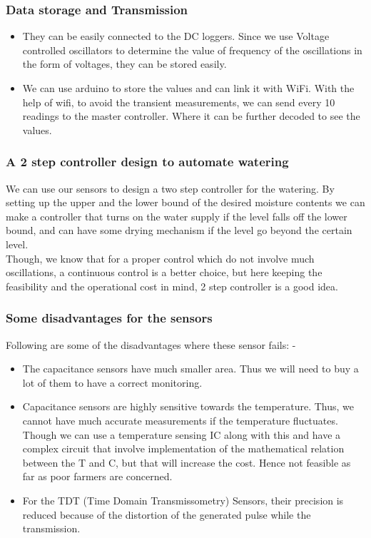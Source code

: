 \documentclass[11pt]{article}
\begin{document}
\subsubsection{Data storage and Transmission}
\begin{itemize}
    \item They can be easily connected to the DC loggers. Since we use Voltage controlled oscillators to determine the value of frequency of the oscillations in the form of voltages, they can be stored easily.
    \item We can use arduino to store the values and can link it with WiFi. With the help of wifi, to avoid the transient measurements, we can send every 10 readings to the master controller. Where it can be further decoded to see the values.
\end{itemize}
\subsubsection{A 2 step controller design to automate watering}
We can use our sensors to design a two step controller for the watering. By setting up the upper and the lower bound of the desired moisture contents we can make a controller that turns on the water supply if the level falls off the lower bound, and can have some drying mechanism if the level go beyond the certain level. \\
Though, we know that for a proper control which do not involve much oscillations, a continuous control is a better choice, but here keeping the feasibility and the operational cost in mind, 2 step controller is a good idea.
\\
\subsubsection{Some disadvantages for the sensors}
Following are some of the disadvantages where these sensor fails: - \\
\begin{itemize}
    \item The capacitance sensors have much smaller area. Thus we will need to buy a lot of them to have a correct monitoring. 
    \item Capacitance sensors are highly sensitive towards the temperature. Thus, we cannot have much accurate measurements if the temperature fluctuates. Though we can use a temperature sensing IC along with this and have a complex circuit that involve implementation of the mathematical relation between the T and C, but that will increase the cost. Hence not feasible as far as poor farmers are concerned. 
    \item For the TDT (Time Domain Transmissometry) Sensors, their precision is reduced because of the distortion of the generated pulse while the transmission.
\end{itemize}
\end{document}
